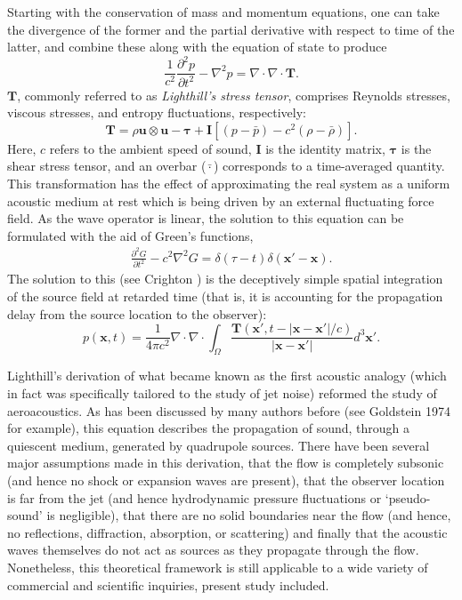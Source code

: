 Starting with the conservation of mass and momentum equations, one can take the divergence of the former and the partial derivative with respect to time of the latter, and combine these along with the equation of state to produce
\begin{equation}
\frac{1}{c^2}\frac{\partial^2 p}{\partial t^2} - \nabla^2 p = \nabla \cdot \nabla \cdot \mathbf{T}.
\end{equation}
$\mathbf{T}$, commonly referred to as \textit{Lighthill's stress tensor}, comprises Reynolds stresses, viscous stresses, and entropy fluctuations, respectively:
\begin{equation}
\mathbf{T} = \rho \mathbf{u} \otimes \mathbf{u} - \mathbf{\tau} + \mathbf{I} \left[ (p-\bar{p}) - c^2 (\rho - \bar{\rho}) \right].
\end{equation}
Here, $c$ refers to the ambient speed of sound, $\mathbf{I}$ is the identity matrix, $\mathbf{\tau}$ is the shear stress tensor, and an overbar ($\bar{\cdot}$) corresponds to a time-averaged quantity.
This transformation has the effect of approximating the real system as a uniform acoustic medium at rest which is being driven by an external fluctuating force field.
As the wave operator is linear, the solution to this equation can be formulated with the aid of Green's functions,
\begin{eqnarray}
\frac{\partial^2 G}{\partial t^2} - c^2 \nabla^2 G = \delta (\tau -t) \delta (\mathbf{x}' - \mathbf{x}).
\end{eqnarray}
The solution to this (see Crighton \etal [cite]) is the deceptively simple spatial integration of the source field at retarded time (that is, it is accounting for the propagation delay from the source location to the observer):
\begin{equation}
p (\mathbf{x},t) = \frac{1}{4 \pi c^2} \nabla \cdot \nabla \cdot \int_{\Omega} \frac{\mathbf{T} (\mathbf{x}',t - |\mathbf{x} - \mathbf{x}'|/c)}{|\mathbf{x} - \mathbf{x}'|} d^3 \mathbf{x}'.
\end{equation}

Lighthill's derivation of what became known as the first acoustic analogy (which in fact was specifically tailored to the study of jet noise) reformed the study of aeroacoustics.
As has been discussed by many authors before (see Goldstein 1974 for example), this equation describes the propagation of sound, through a quiescent medium, generated by quadrupole sources. There have been several major assumptions made in this derivation, that the flow is completely subsonic (and hence no shock or expansion waves are present), that the observer location is far from the jet (and hence hydrodynamic pressure fluctuations or `pseudo-sound' is negligible), that there are no solid boundaries near the flow (and hence, no reflections, diffraction, absorption, or scattering) and finally that the acoustic waves themselves do not act as sources as they propagate through the flow.
Nonetheless, this theoretical framework is still applicable to a wide variety of commercial and scientific inquiries, present study included.

